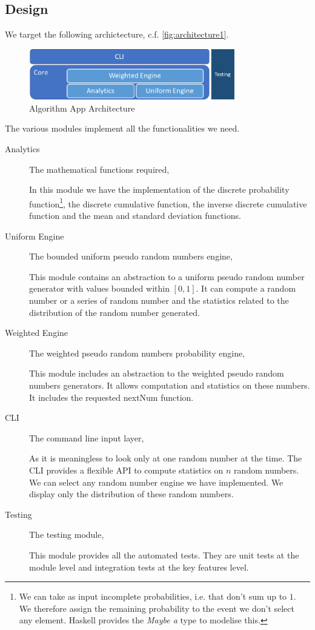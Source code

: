 \documentclass[12pt,a4paper,article]{memoir} %
\begin{document}
\subsection{Design}
We target the following archictecture, c.f. \autoref{fig:architecture1}.
\begin{figure}[h!]
\begin{center}
\includegraphics[width=0.8\textwidth]{img/architecture1.png}
\caption{Algorithm App Architecture}
\label{fig:architecture1}
\end{center}
\end{figure}
The various modules implement all the functionalities we need.
\begin{description}
	\item[Analytics] The mathematical functions required,
	
	In this module we have the implementation of the discrete 
	probability function\footnote{
	We can take as input incomplete probabilities, i.e. that
	don't sum up to $1$. We therefore assign the remaining
	probability to the event we don't select any element.
	Haskell provides the \emph{Maybe a} type to modelise this.
	}, the discrete cumulative function, 
	the inverse discrete cumulative function and the mean and
	standard deviation functions.
	
	\item[Uniform Engine] The bounded uniform 
	pseudo random numbers engine,
	
	This module contains an abstraction to a uniform pseudo
	random number generator with values bounded 
	within $ \left[ 0, 1 \right]$.
	It can compute a random number or a series of random 
	number and the statistics related to the distribution of 
	the random number generated.
	\item[Weighted Engine] 	The weighted pseudo random 
	numbers probability engine,
	
	This module includes an abstraction to the weighted 
	pseudo random numbers generators.
	It allows computation and statistics on these numbers.
	It includes the requested nextNum function.
	\item[CLI] 		The command line input layer,
	
	As it is meaningless to look only at one random number at the time.
	The CLI provides a flexible API to compute
	statistics on $n$ random numbers.
	We can select any random number engine we have implemented.
	We display only the distribution of these random numbers.
	\item[Testing] 	The testing module,
	
	This module provides all the automated tests. They are unit 
	tests at the module level and integration tests at the key
	features level.
\end{description}
\end{document}
